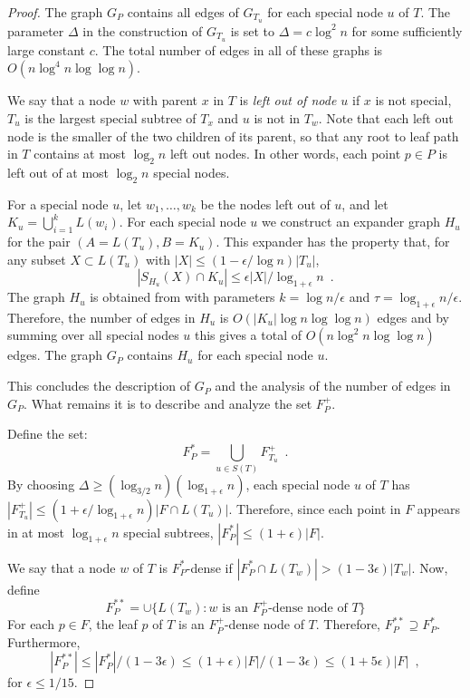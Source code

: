 \documentclass{patmorin}
\begin{document}
\begin{proof}
  The graph $G_P$ contains all edges of $G_{T_u}$ for each special node
  $u$ of $T$.  The parameter $\Delta$ in the construction of $G_{T_u}$
  is set to $\Delta=c\log^2 n$ for some sufficiently large constant $c$.
  The total number of edges in all of these graphs is $O(n\log^4
  n\log\log n)$.  

  We say that a node $w$ with parent $x$ in $T$ is \emph{left out of
  node $u$} if $x$ is not special, $T_u$ is the largest special subtree
  of $T_x$ and $u$ is not in $T_w$. Note that each left out node is the
  smaller of the two children of its parent, so that any root to leaf
  path in $T$ contains at most $\log_2 n$ left out nodes.  In other words,
  each point $p\in P$ is left out of at most $\log_2 n$ special nodes.
	
  For a special node $u$, let $w_1,\ldots,w_k$ be the nodes left out of $u$, and  let $K_u=\bigcup_{i=1}^k L(w_i)$.  For each special node $u$ we construct
  an expander graph $H_u$ for the pair
  $(A=L(T_u),B=K_u)$. This expander has the property that, for any
  subset $X\subset L(T_u)$ with $|X|\le (1-\epsilon/\log n)|T_u|$, 
  \[ |S_{H_u}(X)\cap K_u| \le \epsilon|X|/\log_{1+\epsilon} n \enspace . \] 
  The graph $H_u$ is obtained from  with parameters
  $k=\log n/\epsilon$ and $\tau=\log_{1+\epsilon}n/\epsilon$.  Therefore,
  the number of edges in $H_u$ is $O(|K_u|\log n\log\log n)$ edges and
  by summing over all special nodes $u$ this gives a total of $O(n\log^2
  n\log\log n)$ edges.  The graph $G_P$ contains $H_u$ for each special
  node $u$.

  This concludes the description of $G_P$ and the analysis of the number
  of edges in $G_P$. What remains it is to describe and analyze the
  set $F^+_P$.


  Define the set:
  \[  
    F^*_P = \bigcup_{u\in S(T)} F^+_{T_u} \enspace .
  \]
  By choosing $\Delta \ge (\log_{3/2} n)(\log_{1+\epsilon}
  n)$, each special node $u$ of $T$ has $|F^+_{T_u}|\le
  (1+\epsilon/\log_{1+\epsilon} n)|F\cap L(T_u)|$. Therefore, since
  each point in $F$ appears in at most $\log_{1+\epsilon} n$ special
  subtrees, $|F^*_P|\le (1+\epsilon)|F|$.

  We say that a node $w$ of $T$ is $F^*_P$-dense if $|F^*_P \cap L(T_w)| >
  (1-3\epsilon)|T_w|$.  Now, define
  \[  
     F^{**}_P = \cup\{ L(T_w) : \text{$w$ is an $F^+_P$-dense node of $T$} \}
  \]
  For each $p\in F$, the leaf $p$ of $T$ is an $F^+_P$-dense node of
  $T$. Therefore, $F^{**}_P\supseteq F^{*}_P$.  Furthermore,
  \[
      |F^{**}_P| \le |F^*_P|/(1-3\epsilon) \le (1+\epsilon)|F|/(1-3\epsilon) \le (1+5\epsilon)|F| \enspace ,
  \]
  for $\epsilon \le 1/15$.


\end{proof}
\end{document}
